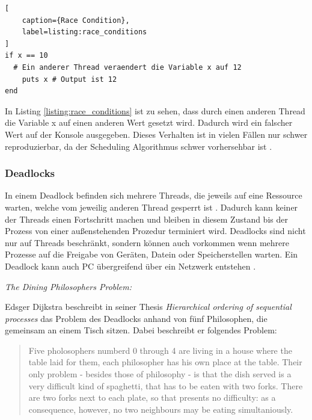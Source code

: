 \begin{lstlisting}[
	caption={Race Condition},
	label=listing:race_conditions
]
if x == 10
  # Ein anderer Thread veraendert die Variable x auf 12
	puts x # Output ist 12 
end
\end{lstlisting}

In Listing \ref{listing:race_conditions} ist zu sehen, dass durch einen anderen Thread die Variable x auf einen anderen Wert gesetzt wird. Dadurch wird ein falscher Wert auf der Konsole ausgegeben. Dieses Verhalten ist in vielen Fällen nur schwer reproduzierbar, da der Scheduling Algorithmus schwer vorhersehbar ist \cite[]{Net92}.

\subsubsection{Deadlocks}

In einem Deadlock befinden sich mehrere Threads, die jeweils auf eine Ressource warten, welche vom jeweilig anderen Thread gesperrt ist \cite[p. 1]{Jah04}. Dadurch kann keiner der Threads einen Fortschritt machen und bleiben in diesem Zustand bis der Prozess von einer außenstehenden Prozedur terminiert wird. Deadlocks sind nicht nur auf Threads beschränkt, sondern können auch vorkommen wenn mehrere Prozesse auf die Freigabe von Geräten, Datein oder Speicherstellen warten. Ein Deadlock kann auch PC übergreifend über ein Netzwerk entstehen \cite[p. 177]{tan09}. 

\emph{The Dining Philosophers Problem:}

Edsger Dijkstra beschreibt in seiner Thesis \emph{Hierarchical ordering of sequential processes} das Problem des Deadlocks anhand von fünf Philosophen, die gemeinsam an einem Tisch sitzen. Dabei beschreibt er folgendes Problem:

\begin{quote}
	Five pholosophers numberd 0 through 4 are living in a house where the table laid for them, each philosopher has his own place at the table. Their only problem - besides those of philosophy - is that the dish served is a very difficult kind of spaghetti, that has to be eaten with two forks. There are two forks next to each plate, so that presents no difficulty: as a consequence, however, no two neighbours may be eating simultaniously. \cite[p. 21]{dij71}
\end{quote} 

